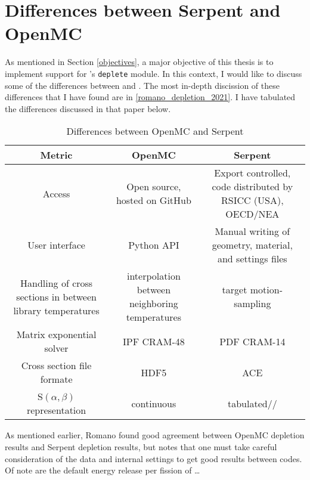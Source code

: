 \section{Differences between Serpent and OpenMC}
As mentioned in Section \ref{objectives}, a major objective of this thesis
is to implement support for \OpenMC's \verb.deplete. module. In this context,
I would like to discuss some of the differences between \OpenMC and \SerpentTWO. The most in-depth discission of these differences that I have found are in \ref{romano_depletion_2021}. I have tabulated the differences discussed in that paper below.
\begin{table}[htpb] 
    \centering 
    \caption{Differences between OpenMC and Serpent} 
    \label{tab:mc_code_diffs}
    \begin{tabular}{|c|c|c|} 
        \hline Metric & OpenMC & Serpent \\ 
        \hline 
        Access & Open source, hosted on GitHub & Export controlled, code distributed by RSICC (USA), OECD/NEA\\
        \hline
        User interface & Python API & Manual writing of geometry, material, and settings files\\
        \hline 
        Handling of cross sections in between library temperatures & interpolation between neighboring temperatures & target motion-sampling \cite{viitanen_explicit_2012}\\
        \hline 
        Matrix exponential solver & IPF CRAM-48 & PDF CRAM-14 \\
        \hline
        Cross section file formate & HDF5 & ACE \\
        \hline
        S$(\alpha, \beta)$ representation & continuous & tabulated//
        \hline
    \end{tabular}
\end{table}
As mentioned earlier, Romano found good agreement between OpenMC depletion results and Serpent depletion results, but notes that one must take careful consideration of the data and internal settings to get good results between codes. Of note are the default energy release per fission of \ldots

